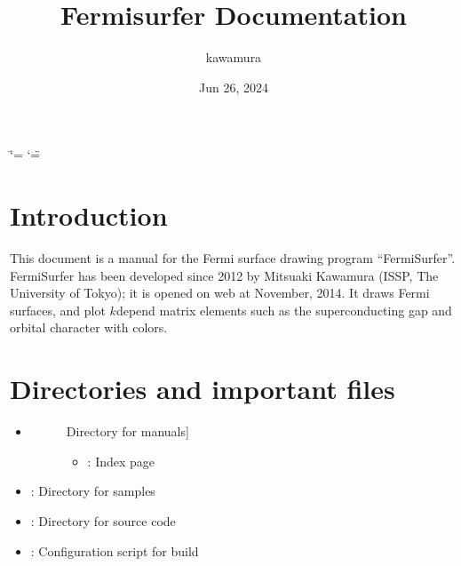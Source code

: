 \documentclass[letterpaper,10pt,pdftex,openany,english]{sphinxmanual}
\title{Fermisurfer Documentation}
\date{Jun 26, 2024}
\author{kawamura}
\begin{document}
\ifdefined\shorthandoff
  \ifnum\catcode`\=\string=\active\shorthandoff{=}\fi
  \ifnum\catcode`\"=\active{}\fi
\fi

\pagestyle{empty}
\sphinxmaketitle
\pagestyle{plain}
\sphinxtableofcontents
\pagestyle{normal}
\label{\detokenize{index::doc}}



\chapter{Introduction}
\label{\detokenize{overview:introduction}}\label{\detokenize{overview::doc}}
\sphinxAtStartPar
This document is a manual for the Fermi surface drawing program
“FermiSurfer”. FermiSurfer has been developed since 2012 by Mitsuaki
Kawamura (ISSP, The University of Tokyo); it is opened on web at
November, 2014. It draws Fermi surfaces, and plot \(k\)\sphinxhyphen{}depend matrix
elements such as the superconducting gap and orbital character with
colors.


\chapter{Directories and important files}
\label{\detokenize{file:directories-and-important-files}}\label{\detokenize{file::doc}}\begin{itemize}
\item {} \begin{description}
\item[{}] \leavevmode{[}Directory for manuals{]}\begin{itemize}
\item {} 
\sphinxAtStartPar
{} : Index page

\end{itemize}

\end{description}

\item {} 
\sphinxAtStartPar
{} : Directory for samples

\item {} 
\sphinxAtStartPar
{} : Directory for source code

\item {} 
\sphinxAtStartPar
{} : Configuration script for build

\end{itemize}
\end{document}
